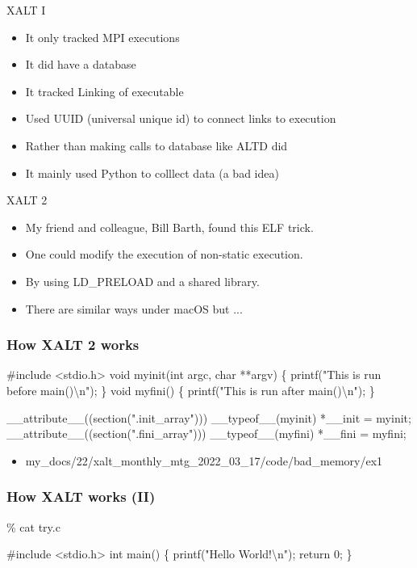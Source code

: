 \documentclass{beamer}
\begin{document}
\begin{frame}{XALT I}
  \begin{itemize}
    \item It only tracked MPI executions
    \item It did have a database
    \item It tracked Linking of executable
    \item Used UUID (universal unique id) to connect links to execution
    \item Rather than making calls to database like ALTD did
    \item It mainly used Python to colllect data (a bad idea)
  \end{itemize}
\end{frame}


\begin{frame}{XALT 2}
  \begin{itemize}
    \item My friend and colleague, Bill Barth, found this ELF trick.
    \item One could modify the execution of non-static execution.
    \item By using LD\_PRELOAD and a shared library.
    \item There are similar ways under macOS but ...
  \end{itemize}
\end{frame}

\begin{frame}[fragile]
    \frametitle{How XALT 2 works}
 {\tiny
    \begin{semiverbatim}
#include <stdio.h>
void myinit(int argc, char **argv)
\{ printf("This is run before main()\textbackslash{}n"); \}
void myfini()
\{ printf("This is run after main()\textbackslash{}n"); \}

__attribute__((section(".init_array"))) __typeof__(myinit) *__init = myinit;
__attribute__((section(".fini_array"))) __typeof__(myfini) *__fini = myfini;
    \end{semiverbatim}
}
  \begin{itemize}
    \item my\_docs/22/xalt\_monthly\_mtg\_2022\_03\_17/code/bad\_memory/ex1
  \end{itemize}
\end{frame}

\begin{frame}[fragile]
    \frametitle{How XALT works (II)}
 {\small
    \begin{semiverbatim}
\% cat try.c

#include <stdio.h>
int main()
\{
  printf("Hello World!\textbackslash{}n");
  return 0;
\}

    \end{semiverbatim}
}
\end{frame}
\end{document}
